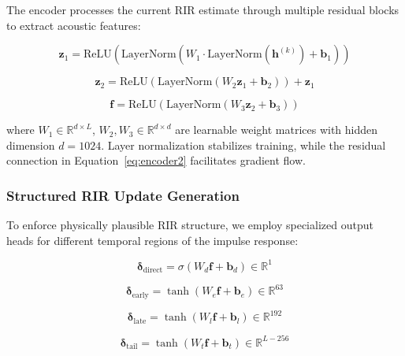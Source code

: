 The encoder processes the current RIR estimate through multiple residual blocks to extract acoustic features:

\begin{equation}
\mathbf{z}_1 = \text{ReLU}(\text{LayerNorm}(W_1 \cdot \text{LayerNorm}(\mathbf{h}^{(k)}) + \mathbf{b}_1))
\label{eq:encoder1}
\end{equation}

\begin{equation}
\mathbf{z}_2 = \text{ReLU}(\text{LayerNorm}(W_2 \mathbf{z}_1 + \mathbf{b}_2)) + \mathbf{z}_1
\label{eq:encoder2}
\end{equation}

\begin{equation}
\mathbf{f} = \text{ReLU}(\text{LayerNorm}(W_3 \mathbf{z}_2 + \mathbf{b}_3))
\label{eq:features}
\end{equation}

\noindent where $W_1 \in \mathbb{R}^{d \times L}$, $W_2, W_3 \in \mathbb{R}^{d \times d}$ are learnable weight matrices with hidden dimension $d = 1024$. Layer normalization stabilizes training, while the residual connection in Equation~\ref{eq:encoder2} facilitates gradient flow.

\subsubsection{Structured RIR Update Generation}

To enforce physically plausible RIR structure, we employ specialized output heads for different temporal regions of the impulse response:

\begin{equation}
\boldsymbol{\delta}_\text{direct} = \sigma(W_d \mathbf{f} + \mathbf{b}_d) \in \mathbb{R}^1
\label{eq:direct_head}
\end{equation}

\begin{equation}
\boldsymbol{\delta}_\text{early} = \tanh(W_e \mathbf{f} + \mathbf{b}_e) \in \mathbb{R}^{63}
\label{eq:early_head}
\end{equation}

\begin{equation}
\boldsymbol{\delta}_\text{late} = \tanh(W_l \mathbf{f} + \mathbf{b}_l) \in \mathbb{R}^{192}
\label{eq:late_head}
\end{equation}

\begin{equation}
\boldsymbol{\delta}_\text{tail} = \tanh(W_t \mathbf{f} + \mathbf{b}_t) \in \mathbb{R}^{L-256}
\label{eq:tail_head}
\end{equation}

